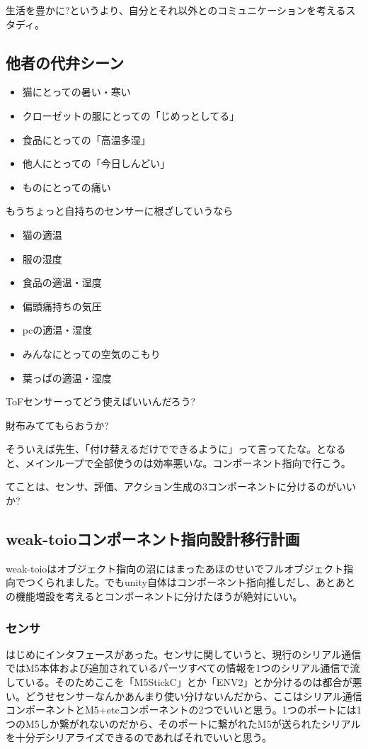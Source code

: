 \documentclass[fleqn,twocolumn]{mynote}
\begin{document}
  生活を豊かに?というより、自分とそれ以外とのコミュニケーションを考えるスタディ。

  \subsection*{他者の代弁シーン}
  \begin{itemize}
    \item 猫にとっての暑い・寒い
    \item クローゼットの服にとっての「じめっとしてる」
    \item 食品にとっての「高温多湿」
    \item 他人にとっての「今日しんどい」
    \item ものにとっての痛い
  \end{itemize}

  もうちょっと自持ちのセンサーに根ざしていうなら
  \begin{itemize}
    \item 猫の適温
    \item 服の湿度
    \item 食品の適温・湿度
    \item 偏頭痛持ちの気圧
    \item pcの適温・湿度
    \item みんなにとっての空気のこもり
    \item 葉っぱの適温・湿度
  \end{itemize}

  ToFセンサーってどう使えばいいんだろう?

  財布みててもらおうか?

  そういえば先生、「付け替えるだけでできるように」って言ってたな。となると、メインループで全部使うのは効率悪いな。コンポーネント指向で行こう。

  てことは、センサ、評価、アクション生成の3コンポーネントに分けるのがいいか?

  \subsection*{weak-toioコンポーネント指向設計移行計画}
  weak-toioはオブジェクト指向の沼にはまったあほのせいでフルオブジェクト指向でつくられました。でもunity自体はコンポーネント指向推しだし、あとあとの機能増設を考えるとコンポーネントに分けたほうが絶対にいい。

  \subsubsection*{センサ}
  はじめにインタフェースがあった。センサに関していうと、現行のシリアル通信ではM5本体および追加されているパーツすべての情報を1つのシリアル通信で流している。そのためここを「M5StickC」とか「ENV2」とか分けるのは都合が悪い。どうせセンサーなんかあんまり使い分けないんだから、ここはシリアル通信コンポーネントとM5+etcコンポーネントの2つでいいと思う。1つのポートには1つのM5しか繋がれないのだから、そのポートに繋がれたM5が送られたシリアルを十分デシリアライズできるのであればそれでいいと思う。
\end{document}
